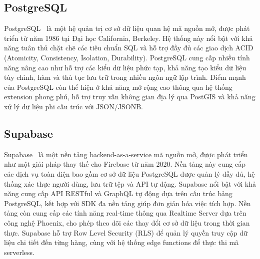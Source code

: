 \subsection{PostgreSQL}
PostgreSQL~\cite{postgresqldoc} là một hệ quản trị cơ sở dữ liệu quan hệ mã nguồn mở, được phát triển từ năm 1986 tại Đại học California, Berkeley. Hệ thống này nổi bật với khả năng tuân thủ chặt chẽ các tiêu chuẩn SQL và hỗ trợ đầy đủ các giao dịch ACID (Atomicity, Consistency, Isolation, Durability). PostgreSQL cung cấp nhiều tính năng nâng cao như hỗ trợ các kiểu dữ liệu phức tạp, khả năng tạo kiểu dữ liệu tùy chỉnh, hàm và thủ tục lưu trữ trong nhiều ngôn ngữ lập trình. Điểm mạnh của PostgreSQL còn thể hiện ở khả năng mở rộng cao thông qua hệ thống extension phong phú, hỗ trợ truy vấn không gian địa lý qua PostGIS và khả năng xử lý dữ liệu phi cấu trúc với JSON/JSONB. 

\subsection{Supabase}
Supabase~\cite{supabasedoc} là một nền tảng backend-as-a-service mã nguồn mở, được phát triển như một giải pháp thay thế cho Firebase từ năm 2020. Nền tảng này cung cấp các dịch vụ toàn diện bao gồm cơ sở dữ liệu PostgreSQL được quản lý đầy đủ, hệ thống xác thực người dùng, lưu trữ tệp và API tự động. Supabase nổi bật với khả năng cung cấp API RESTful và GraphQL tự động dựa trên cấu trúc bảng PostgreSQL, kết hợp với SDK đa nền tảng giúp đơn giản hóa việc tích hợp. Nền tảng còn cung cấp các tính năng real-time thông qua Realtime Server dựa trên công nghệ Phoenix, cho phép theo dõi các thay đổi cơ sở dữ liệu trong thời gian thực. Supabase hỗ trợ Row Level Security (RLS) để quản lý quyền truy cập dữ liệu chi tiết đến từng hàng, cùng với hệ thống edge functions để thực thi mã serverless. 
